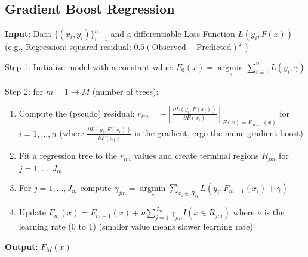 \documentclass[
]{book}
\providecommand{\tightlist}{%
  \setlength{\itemsep}{0pt}\setlength{\parskip}{0pt}}
\begin{document}
\hypertarget{gradient-boost-regression}{%
\subsection{Gradient Boost Regression}\label{gradient-boost-regression}}

\textbf{Input}: Data \(\{(x_i, y_i)\}^n_{i=1}\) and a differentiable Loss Function \(L(y_i, F(x))\) (e.g., Regression: squared residual: \(0.5(\text{Observed} - \text{Predicted})^2\) )

Step 1: Initialize model with a constant value: \(F_0(x) = \underset{\gamma}{\operatorname{argmin}} \sum_{i=1}^n L(y_i, \gamma)\)

Step 2: for \(m = 1 \to M\) (number of trees):

\begin{enumerate}
\def\labelenumi{\arabic{enumi}.}
\tightlist
\item
  Compute the (pseudo) residual: \(r_{im} = - [ \frac{\partial L( y_i, F(x_i))}{\partial F(x_i)}]_{F(x) = F_{m-1}(x)}\) for \(i = 1, \dots, n\) (where \(\frac{\partial L( y_i, F(x_i))}{\partial F(x_i)}\) is the gradient, ergo the name gradient boost)
\item
  Fit a regression tree to the \(r_{im}\) values and create terminal regions \(R_{jm}\) for \(j = 1, \dots, J_m\)
\item
  For \(j = 1, \dots, J_m\) compute \(\gamma_{jm} = \underset{\gamma}{\operatorname{argmin}} \sum_{x_i \in R_{ij}} L(y_i, F_{m-1}(x_i) + \gamma)\)
\item
  Update \(F_m (x) = F_{m-1}(x) + \nu \sum_{j=1}^{J_m} \gamma_{jm} I(x \in R_{jm})\) where \(\nu\) is the learning rate (0 to 1) (smaller value means slower learning rate)
\end{enumerate}

\textbf{Output}: \(F_M(x)\)
\end{document}
